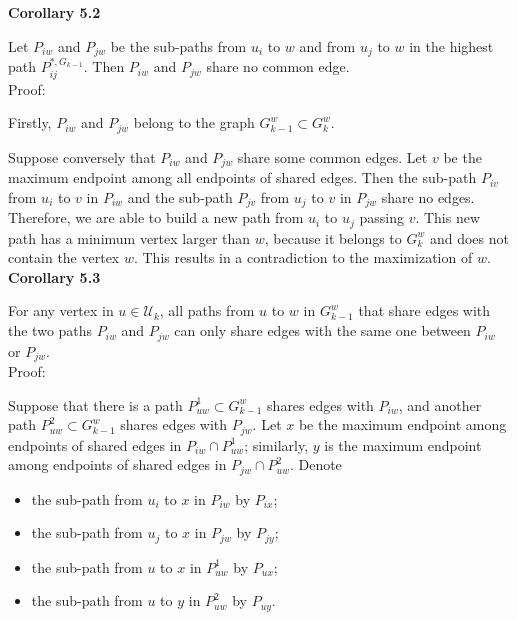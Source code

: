 \documentclass[a4paper,12pt]{article}
\numberwithin{equation}{section}
\begin{document}
	\noindent \textbf{Corollary 5.2}
	
	Let $P_{iw}$ and $P_{jw}$ be the sub-paths from $u_i$ to $w$ and from $u_j$ to $w$ in the highest path $P_{ij}^{*,G_{k-1}}$. Then $P_{iw}$ and $P_{jw}$ share no common edge.\\
	
	\noindent Proof:
	
	Firstly, $P_{iw}$ and $P_{jw}$ belong to the graph $G_{k-1}^w \subset G_{k}^w$.
	
	Suppose conversely that $P_{iw}$ and $P_{jw}$ share some common edges. Let $v$ be the maximum endpoint among all endpoints of shared edges. Then the sub-path $P_{iv}$ from $u_i$ to $v$ in $P_{iw}$ and the sub-path $P_{jv}$ from $u_j$ to $v$ in $P_{jw}$ share no edges. Therefore, we are able to build a new path from $u_i$ to $u_j$ passing $v$. This new path has a minimum vertex larger than $w$, because it belongs to $G^w_k$ and does not contain the vertex $w$. This results in a contradiction to the maximization of $w$.\\
	
	\noindent \textbf{Corollary 5.3}
	
	For any vertex in $u \in \mathcal{U}_k$, all paths from $u$ to $w$ in $G_{k-1}^w$ that share edges with the two paths $P_{iw}$ and $P_{jw}$ can only share edges with the same one between $P_{iw}$ or $P_{jw}$.\\	
	
	\noindent Proof: 
	
	Suppose that there is a path $P^1_{uw} \subset G_{k-1}^w$ shares edges with $P_{iw}$, and another path $P_{uw}^2 \subset G_{k-1}^w$ shares edges with $P_{jw}$. Let $x$ be the maximum endpoint among endpoints of shared edges in $P_{iw} \cap P^1_{uw}$; similarly, $y$ is the maximum endpoint among endpoints of shared edges in $P_{jw} \cap P^2_{uw}$. Denote 
	\begin{itemize}
		\item the sub-path from $u_i$ to $x$ in $P_{iw}$ by $P_{ix}$;
		\item the sub-path from $u_j$ to $x$ in $P_{jw}$ by $P_{jy}$;
		\item the sub-path from $u$ to $x$ in $P^1_{uw}$ by $P_{ux}$;
		\item the sub-path from $u$ to $y$ in $P^2_{uw}$ by $P_{uy}$.
	\end{itemize}
	
\end{document}
